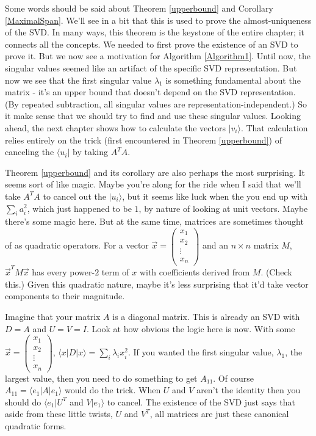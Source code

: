 \documentclass{amsbook}
\begin{document}
Some words should be said about Theorem \ref{upperbound} and Corollary \ref{MaximalSpan}.  We'll see in a bit that this is used to prove the almost-uniqueness of the SVD.  In many ways, this theorem is the keystone of the entire chapter; it connects all the concepts.  We needed to first prove the existence of an SVD to prove it.  But we now see a motivation for Algorithm \ref{Algorithm1}.  Until now, the singular values seemed like an artifact of the specific SVD representation.  But now we see that the first singular value $\lambda_1$ is something fundamental about the matrix - it's an upper bound that doesn't depend on the SVD representation.  (By repeated subtraction, all singular values are representation-independent.)  So it make sense that we should try to find and use these singular values.  Looking ahead, the next chapter shows how to calculate the vectors $|v_i\rangle$.  That calculation relies entirely on the trick (first encountered in Theorem \ref{upperbound}) of canceling the $\langle u_i|$ by taking $A^TA$.

Theorem \ref{upperbound} and its corollary are also perhaps the most surprising.  It seems sort of like magic.  Maybe you're along for the ride when I said that we'll take $A^TA$ to cancel out the $|u_i\rangle$, but it seems like luck when the you end up with $\sum_ia_i^2$, which just happened to be $1$, by nature of looking at unit vectors.  Maybe there's some magic here.  But at the same time, matrices are sometimes thought of as quadratic operators.  For a vector $\vec x=\left(\begin{array}{c}x_1\\x_2\\\vdots\\x_n\end{array}\right)$ and an $n\times n$ matrix $M$, $\vec x^TM\vec x$ has every power-$2$ term of $x$ with coefficients derived from $M$.  (Check this.)  Given this quadratic nature, maybe it's less surprising that it'd take vector components to their magnitude.

Imagine that your matrix $A$ is a diagonal matrix.  This is already an SVD with $D=A$ and $U=V=I$.  Look at how obvious the logic here is now.  With some $\vec x=\left(\begin{array}{c}x_1\\x_2\\\vdots\\x_n\end{array}\right)$, $\langle x|D|x\rangle=\sum_i\lambda_ix_i^2$.  If you wanted the first singular value, $\lambda_1$, the largest value, then you need to do something to get $A_{11}$.  Of course $A_{11}=\langle e_1|A|e_1\rangle$ would do the trick.  When $U$ and $V$ aren't the identity then you should do $\langle e_1|U^T$ and $V|e_1\rangle$ to cancel.  The existence of the SVD just says that aside from these little twists, $U$ and $V^T$, all matrices are just these canonical quadratic forms.
\end{document}
